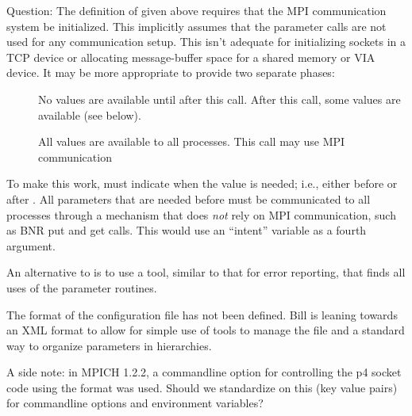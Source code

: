 \documentclass{article}
\begin{document}
Question: The definition of  given above
requires that the MPI communication system be initialized.  This
implicitly assumes that the parameter calls are not used for any
communication setup.  This isn't adequate for initializing sockets in
a TCP device or allocating message-buffer space for a shared memory or
VIA device.  It may be more appropriate to provide two separate
phases:
\begin{description}
\item[]No values are available until after this call.  
After this call, some values are available (see below).
\item[]All values are available to all processes.  This 
call may use MPI communication
\end{description}
To make this work,  must indicate when the
value is needed; i.e., either before or after
.  All parameters that are needed before
 must be communicated to all processes through
a mechanism that does \emph{not} rely on MPI communication, such as
BNR put and get calls.  This would use an ``intent'' variable as a
fourth argument.


An alternative to  is to use a tool, similar to that
for error reporting, that finds all uses of the parameter routines.


The format of the configuration file has not been defined.  Bill is leaning
towards an XML format to allow for simple use of tools to manage the file and
a standard way to organize parameters in hierarchies.

A side note: in MPICH 1.2.2, a commandline option for controlling the
p4 socket code using the format 
was used.  Should we standardize on this (key \code{=} value pairs)
for commandline options and environment variables?
\end{document}
